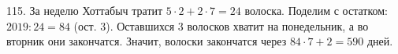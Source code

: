 115. За неделю Хоттабыч тратит $5\cdot2+2\cdot7=24$ волоска. Поделим с остатком: $2019:24=84$ (ост. 3). Оставшихся 3 волосков хватит на понедельник, а во вторник они закончатся. Значит, волоски закончатся через $84\cdot7+2=590$ дней.\\
